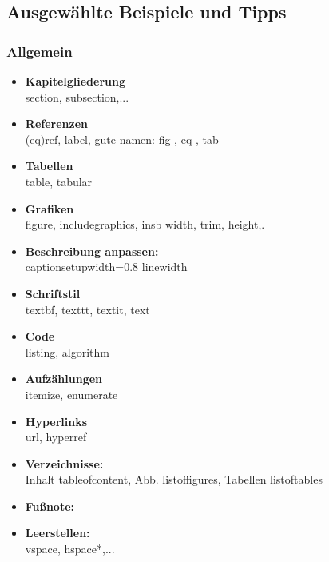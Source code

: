 \subsection{Ausgewählte Beispiele und Tipps}
\subsubsection{Allgemein}
\begin{itemize}
	\item \textbf{Kapitelgliederung}\\
	section, subsection,...
	\item \textbf{Referenzen}\\
	 (eq)ref, label, gute namen: fig-, eq-, tab-
	\item \textbf{Tabellen}\\
	table, tabular
	\item \textbf{Grafiken}\\
	figure, includegraphics, insb width, trim, height,.
	\item \textbf{Beschreibung anpassen:} \\
	captionsetup{width=0.8 linewidth}
	\item \textbf{Schriftstil}\\
	textbf, texttt, textit, text
	\item \textbf{Code}\\
	listing, algorithm
	\item \textbf{Aufzählungen}\\
	itemize, enumerate
	\item \textbf{Hyperlinks}\\
	url, hyperref
	\item \textbf{Verzeichnisse:}\\
	Inhalt tableofcontent, Abb. listoffigures, Tabellen listoftables
	\item \textbf{Fußnote:} 
	\item \textbf{Leerstellen:}\\
	vspace, hspace*,...\\
\end{itemize}

